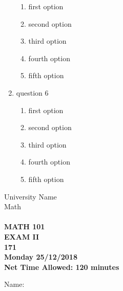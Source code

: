 \documentclass[amsfonts,bezier,leqno,fleqn,12pt,a4paper]{article}
\begin{document}
\begin{large}
\begin{enumerate}
\begin{enumerate}
  \item first option
  \item second option
  \item third option
  \item fourth option
  \item fifth option
\end{enumerate}
\vspace {3.5cm}
\item question 6
\vspace {0.3in}
\setcounter{equation}{0}

\begin{enumerate}
  \item first option
  \item second option
  \item third option
  \item fourth option
  \item fifth option
\end{enumerate}
\newpage
\end{enumerate}
\end{large}

\newpage


\thispagestyle{empty}
\begin{center}
    \begin{large}
        University Name \\ 
        Math \\ 
        \vspace*{4.5cm}
        {\bf {} }  \hfill {\bf {}} \\
        {\bf MATH 101 }  \\
        {\bf EXAM II }  \\
        {\bf 171 }  \\
        {\bf Monday 25/12/2018 }  \\ 
        {\bf Net Time Allowed: 120 minutes }  \\
        \vspace*{0.2cm}

    \end{large}
\end{center}

\large{Name:  }\hrulefill

\vspace{3mm}
\end{document}
